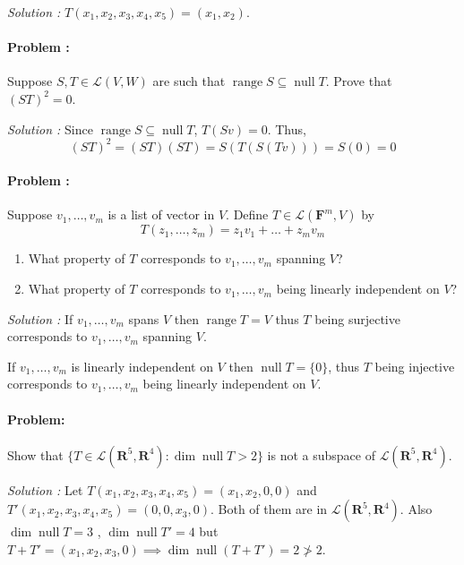 \vspace{4mm}
\textit{Solution :} $T(x_1,x_2,x_3,x_4,x_5)=(x_1,x_2)$.

\paragraph{Problem :} Suppose $S,T \in \mathcal{L}(V,W)$ are such that $\operatorname{range} S \subseteq \operatorname{null} T$.
Prove that $(ST)^2=0$.

\vspace{4mm}
\textit{Solution :} Since $\operatorname{range} S \subseteq \operatorname{null} T$, $T(Sv)=0$. Thus, 
\[ (ST)^2=(ST)(ST)= S(T(S(Tv)))=S(0)=0 \]

\paragraph{Problem :} Suppose $v_1,\ldots,v_m$ is a list of vector in $V$. Define $T \in \mathcal{L}(\mathbf{F}^m,V)$ by
\[ T(z_1,\ldots,z_m)= z_1 v_1 + \ldots + z_m v_m\]
\begin{enumerate}[label=\alph*.]
    \item What property of $T$ corresponds to $v_1, \ldots, v_m$ spanning $V$?
    \item What property of $T$ corresponds to $v_1, \ldots, v_m$ being linearly independent on $V$?
\end{enumerate}

\vspace{4mm}
\textit{Solution :} If $v_1, \ldots, v_m$ spans $V$ then $\operatorname{range} T = V$ thus $T$ being surjective corresponds to 
$v_1,\ldots,v_m$ spanning $V$.

If $v_1,\ldots,v_m$ is linearly independent on $V$ then $\operatorname{null} T = \{0\}$, thus $T$ being injective corresponds to 
$v_1, \ldots, v_m$ being linearly independent on $V$.

\eject

\paragraph{Problem:} Show that $\{T \in \mathcal{L}(\mathbf{R}^5 , \mathbf{R}^4 ) : \dim \operatorname{null} T > 2\}$ 
is not a subspace of $\mathcal{L}(\mathbf{R}^5, \mathbf{R}^4 )$.

\vspace{4mm}
\textit{Solution :}
Let $T(x_1,x_2,x_3,x_4,x_5)=(x_1,x_2,0,0)$ and $T'(x_1,x_2,x_3,x_4,x_5)=(0,0,x_3,0)$. Both of them are in 
$\mathcal{L}(\mathbf{R}^5, \mathbf{R}^4 )$. Also $\dim \operatorname{null} T = 3$ , $\dim \operatorname{null} T'=4$ but
$T+T'=(x_1,x_2,x_3,0) \implies \dim \operatorname{null} (T+T') = 2 \not > 2$.

